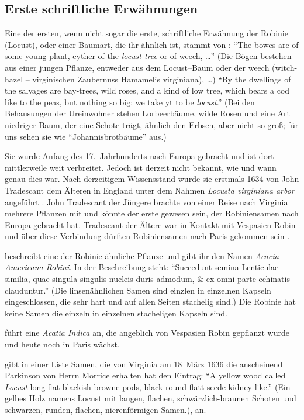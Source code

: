 \documentclass[twocolumn]{scrartcl}
\begin{document}
\subsection{Erste schriftliche Erwähnungen}

Eine der ersten, wenn nicht sogar die erste, schriftliche Erwähnung
der Robinie (Locust), oder einer Baumart, die ihr ähnlich ist, stammt von
\cite{strachey1610-1612historie}: \enquote{The bowes are of some young
plant, eyther of the \emph{locust-tree} or of weech, \dots} (Die
Bögen bestehen aus einer jungen Pflanze, entweder aus dem Locust--Baum oder
der weech (witch-hazel -- virginischen Zaubernuss Hamamelis virginiana),
\dots) \enquote{By the dwellings of the salvages are bay-trees, wild
roses, and a kind of low tree, which bears a cod like to the peas, but
nothing so big: we take yt to be \emph{locust}.} (Bei den
Behausungen der Ureinwohner stehen Lorbeerbäume, wilde Rosen und eine
Art niedriger Baum, der eine Schote trägt, ähnlich den Erbsen, aber
nicht so groß; für uns sehen sie wie \enquote{Johannisbrotbäume} aus.)

Sie wurde Anfang des 17.~Jahrhunderts nach Europa gebracht und ist
dort mittlerweile weit verbreitet. Jedoch ist derzeit nicht bekannt,
wie und wann genau dies war. Nach derzeitigem Wissensstand wurde sie
erstmals 1634 von John Tradescant dem Älteren in England unter dem
Nahmen \emph{Locusta virginiana arbor} angeführt
\citep[S.~339]{gunther1922botanists}. John Tradescant
der Jüngere brachte von einer Reise nach Virginia mehrere Pflanzen mit
und könnte der erste gewesen sein, der Robiniensamen nach Europa
gebracht hat. Tradescant der Ältere war in Kontakt mit Vespasien
Robin und über diese Verbindung dürften Robiniensamen nach Paris
gekommen sein \citep{bouteiller2019robinie}.

\citet[S.~171--173]{cornuti1635robinie} beschreibt eine der Robinie
ähnliche Pflanze und gibt ihr den Namen \emph{Acacia Americana
Robini}. In der Beschreibung steht: \enquote{Succedunt semina Lenticulae
similia, quae singula singulis nucleis duris admodum, \& ex omni parte
echinatis clauduntur.} (Die linsenähnlichen Samen sind einzlen in
einzelnen Kapseln eingeschlossen, die sehr hart und auf allen Seiten
stachelig sind.) Die Robinie hat keine Samen die einzeln in einzelnen
stacheligen Kapseln sind.

\citet[S.~28]{deLaBrosse1636robinie} führt eine \emph{Acatia Indica}
an, die angeblich von Vespasien Robin gepflanzt wurde und heute noch
in Paris wächst.

\citet[S.~370]{gunther1922botanists} gibt in einer Liste Samen, die
von Virginia am 18~März 1636 die anscheinend Parkinson von Herrn
Morrice erhalten hat den Eintrag: \enquote{A yellow wood called
\emph{Locust} long flat blackish browne pods, black round flatt seede
kidney like.} (Ein gelbes Holz namens Locust mit langen, flachen,
schwärzlich-braunen Schoten und schwarzen, runden, flachen,
nierenförmigen Samen.), an.
\end{document}
